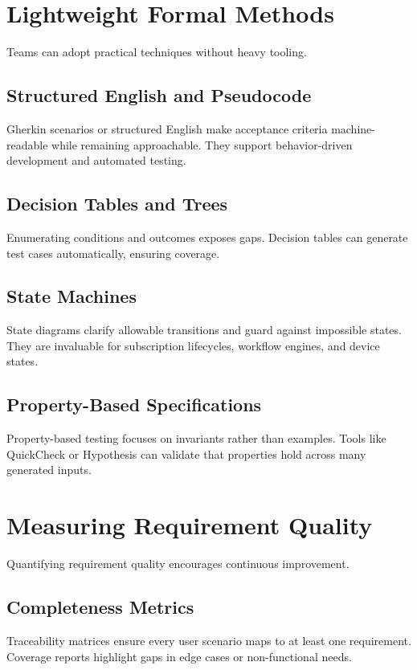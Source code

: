 \section{Lightweight Formal Methods}
\label{sec:lightweight-formal}

Teams can adopt practical techniques without heavy tooling.

\subsection{Structured English and Pseudocode}
Gherkin scenarios or structured English make acceptance criteria machine-readable while remaining approachable. They support behavior-driven development and automated testing.

\subsection{Decision Tables and Trees}
Enumerating conditions and outcomes exposes gaps. Decision tables can generate test cases automatically, ensuring coverage.

\subsection{State Machines}
State diagrams clarify allowable transitions and guard against impossible states. They are invaluable for subscription lifecycles, workflow engines, and device states.

\subsection{Property-Based Specifications}
Property-based testing focuses on invariants rather than examples. Tools like QuickCheck or Hypothesis can validate that properties hold across many generated inputs.

\section{Measuring Requirement Quality}
\label{sec:measuring-quality}

Quantifying requirement quality encourages continuous improvement.

\subsection{Completeness Metrics}
Traceability matrices ensure every user scenario maps to at least one requirement. Coverage reports highlight gaps in edge cases or non-functional needs.

